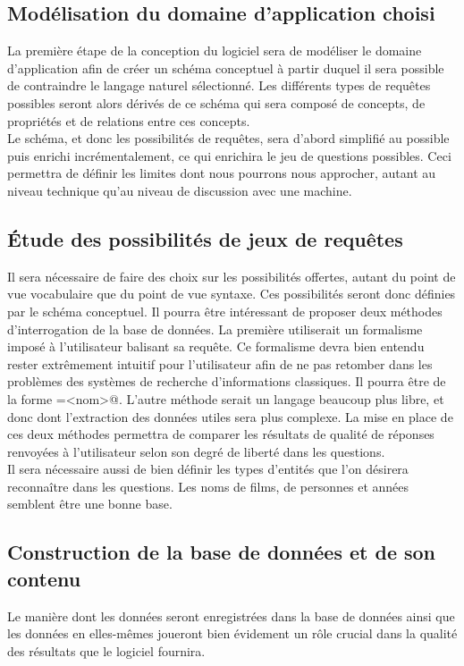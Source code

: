\documentclass[a4paper,12pt]{article}
\begin{document}
\subsection{Modélisation du domaine d'application choisi}
La première étape de la conception du logiciel sera de modéliser le domaine d'application afin de créer un schéma conceptuel à partir duquel il sera possible de contraindre le langage naturel sélectionné. Les différents types de requêtes possibles seront alors dérivés de ce schéma qui sera composé de concepts, de propriétés et de relations entre ces concepts. \\

Le schéma, et donc les possibilités de requêtes, sera d'abord simplifié au possible puis enrichi incrémentalement, ce qui enrichira le jeu de questions possibles.
Ceci permettra de définir les limites dont nous pourrons nous approcher, autant au niveau technique qu'au niveau de discussion avec une machine.
\subsection{Étude des possibilités de jeux de requêtes}
Il sera nécessaire de faire des choix sur les possibilités offertes, autant du point de vue vocabulaire que du point de vue syntaxe.
Ces possibilités seront donc définies par le schéma conceptuel.
Il pourra être intéressant de proposer deux méthodes d'interrogation de la base de données.
La première utiliserait un formalisme imposé à l'utilisateur balisant sa requête.
Ce formalisme devra bien entendu rester extrêmement intuitif pour l'utilisateur afin de ne pas retomber dans les problèmes des systèmes de recherche d'informations classiques.
Il pourra être de la forme \verb@actor=<nom>@. 
L'autre méthode serait un langage beaucoup plus libre, et donc dont l'extraction des données utiles sera plus complexe. 
La mise en place de ces deux méthodes permettra de comparer les résultats de qualité de réponses renvoyées à l'utilisateur selon son degré de liberté dans les questions. \\

Il sera nécessaire aussi de bien définir les types d'entités que l'on désirera reconnaître dans les questions.
Les noms de films, de personnes et années semblent être une bonne base. 
\subsection{Construction de la base de données et de son contenu}
Le manière dont les données seront enregistrées dans la base de données ainsi que les données en elles-mêmes joueront bien évidement un rôle crucial dans la qualité des résultats que le logiciel fournira.
\end{document}
